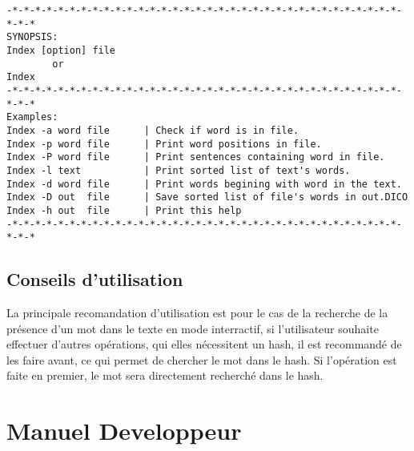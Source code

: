 \documentclass[french, 12pt, titlepage]{article}
\begin{document}
\begin{lstlisting}
-*-*-*-*-*-*-*-*-*-*-*-*-*-*-*-*-*-*-*-*-*-*-*-*-*-*-*-*-*-*-*-*-*-*-*-*-*
SYNOPSIS:
Index [option] file
        or
Index
-*-*-*-*-*-*-*-*-*-*-*-*-*-*-*-*-*-*-*-*-*-*-*-*-*-*-*-*-*-*-*-*-*-*-*-*-*
Examples:
Index -a word file      | Check if word is in file.
Index -p word file      | Print word positions in file.
Index -P word file      | Print sentences containing word in file.
Index -l text           | Print sorted list of text's words.
Index -d word file      | Print words begining with word in the text.
Index -D out  file      | Save sorted list of file's words in out.DICO
Index -h out  file      | Print this help
-*-*-*-*-*-*-*-*-*-*-*-*-*-*-*-*-*-*-*-*-*-*-*-*-*-*-*-*-*-*-*-*-*-*-*-*-*
\end{lstlisting}

\subsection{Conseils d'utilisation}
La principale recomandation d'utilisation est pour le cas de la
recherche de la présence d'un mot dans le texte en mode interractif,
si l'utilisateur souhaite effectuer d'autres opérations, qui elles
nécessitent un hash, il est recommandé de les faire avant, ce qui
permet de chercher le mot dans le hash. Si l'opération est faite en
premier, le mot sera directement recherché dans le hash.

\section{Manuel Developpeur}
\end{document}
